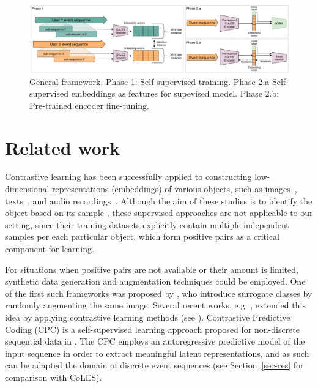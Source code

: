\documentclass[sigconf]{acmart}
\begin{document}
\begin{figure}[htbp]
  \includegraphics[width=\linewidth]{figures/CoLES.pdf}
    \caption{
        General framework.
        Phase 1: Self-supervised training.
        Phase 2.a Self-supervised embeddings as features for supevised model.
        Phase 2.b: Pre-trained encoder fine-tuning.
    }
  \label{fig-arch}
\end{figure}

\section{Related work} \label{sec-rel-work}

Contrastive learning has been successfully applied to constructing low-dimensional representations
(embeddings) of various objects, such as images~\citep{Chopra2005LearningAS,Schroff2015FaceNetAU},
texts~\citep{Reimers2019SentenceBERTSE}, and audio recordings~\citep{Wan2018GeneralizedEL}.
Although the aim of these studies is to identify the object based on its sample
\citep{Schroff2015FaceNetAU,Hu2014DiscriminativeDM,Wan2018GeneralizedEL}, these supervised
approaches are not applicable to our setting, since their training datasets explicitly contain
multiple independent samples per each particular object, which form positive pairs as
a critical component for learning. 

For situations when positive pairs are not available or their amount is limited, synthetic data
generation and augmentation techniques could be employed. One of the first such frameworks was
proposed by \citet{Dosovitskiy2014DiscriminativeUF}, who introduce surrogate classes by randomly
augmenting the same image. Several recent works, e.g. \citep{Bachman2019LearningRB,He2019MomentumCF,Chen2020ASF},
extended this idea by applying contrastive learning methods (see \citep{Falcon2020AFF}).
%
Contrastive Predictive Coding (CPC) is a self-supervised learning approach proposed for non-discrete
sequential data in \citep{Oord2018RepresentationLW}. The CPC employs an autoregressive predictive
model of the input sequence in order to extract meaningful latent representations, and as such
can be adapted the domain of discrete event sequences (see Section~\ref{sec-res} for comparison
with CoLES).
\end{document}
